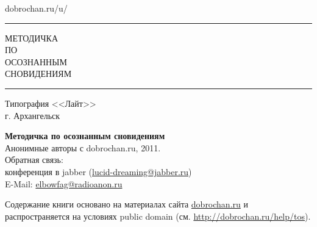 
\begin{titlingpage}


\begin{center}

\hspace{1cm}

\begin{large}
\textsf{dobrochan.ru/u/}
\end{large}

\hspace{1cm}

\rule{6.5cm}{0.4mm}

 \begin{Huge}
   \fontsize{25}{30}\selectfont МЕТОДИЧКА\\ {\Large{ПО}}\\ ОСОЗНАННЫМ\\ СНОВИДЕНИЯМ\\
	\end{Huge}
    \normalsize

\rule{6.5cm}{0.4mm}


\vfill



\vfill





\textsf{Типография <<Лайт>>}\\
\textsf{г. Архангельск}\\
{\small{}}

\end{center}

\newpage

\vspace*{\fill}

\begin{flushleft}
\begin{minipage}{0.85\textwidth}
\begin{flushleft}

\small
\textbf{Методичка по осознанным сновидениям}\\
Анонимные авторы с dobrochan.ru, 2011.\\
Обратная связь:\\ конференция в jabber (\url{lucid-dreaming@jabber.ru})\\
E-Mail: \url{elbowfag@radioanon.ru}\\

\medskip

Содержание книги основано на материалах сайта \url{dobrochan.ru} и распространяется на условиях public domain (см. \url{http://dobrochan.ru/help/tos}).


\end{flushleft}
\end{minipage}
\end{flushleft}
\end{titlingpage}
